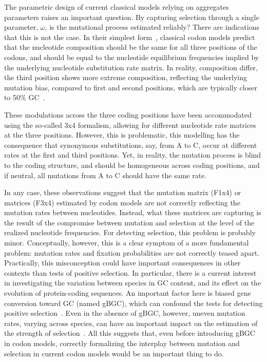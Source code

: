 The parametric design of current classical models relying on aggregates parameters raises an important question.
By capturing selection through a single parameter, $\omega$, is the mutational process estimated reliably?
There are indications that this is not the case.
In their simplest form~\citep{Muse1994}, classical codon models predict that the nucleotide composition should be the same for all three positions of the codons, and should be equal to the nucleotide equilibrium frequencies implied by the underlying nucleotide substitution rate matrix.
In reality, composition differ, the third position shows more extreme composition, reflecting the underlying mutation bias, compared to first and second positions, which are typically closer to 50\% GC~\citep{Singer2000}.

These modulations across the three coding positions have been accommodated using the so-called 3x4 formalism, allowing for different nucleotide rate matrices at the three positions.
However, this is problematic, this modelling has the consequence that synonymous substitutions, say, from A to C, occur at different rates at the first and third positions.
Yet, in reality, the mutation process is blind to the coding structure, and should be homogeneous across coding positions, and if neutral, all mutations from A to C should have the same rate.

In any case, these observations suggest that the mutation matrix (F1x4) or matrices (F3x4) estimated by codon models are not correctly reflecting the mutation rates between nucleotides.
Instead, what these matrices are capturing is the result of the compromise between mutation and selection at the level of the realized nucleotide frequencies.
For detecting selection, this problem is probably minor.
Conceptually, however, this is a clear symptom of a more fundamental problem: mutation rates and fixation probabilities are not correctly teased apart.
Practically, this misconception could have important consequences in other contexts than tests of positive selection.
In particular, there is a current interest in investigating the variation between species in GC content, and its effect on the evolution of protein-coding sequences.
An important factor here is biased gene conversion toward GC (named gBGC), which can confound the tests for detecting positive selection~\citep{Galtier2009,Ratnakumar2010, Figuet2014}.
Even in the absence of \acrshort{gBGC}, however, uneven mutation rates, varying across species, can have an important impact on the estimation of the strength of selection~\citep{Galtier2009,Ratnakumar2010, Figuet2014}.
All this suggests that, even before introducing \acrshort{gBGC} in codon models, correctly formalizing the interplay between mutation and selection in current codon models would be an important thing to do.

